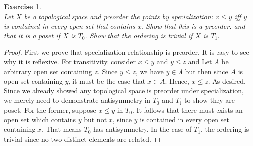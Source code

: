 \documentclass[a4paper, 11pt]{book}
\theoremstyle{plain}
\newtheorem{exercise}{Exercise}[chapter]
\theoremstyle{plain}
\begin{document}
  \begin{exercise} $ $ \\
    Let $X$ be a topological space and preorder the points by specialization: $x \leq y$ iff $y$ is contained in every open set that contains $x$. Show that this is a preorder, and that it is a poset if $X$ is $T_0$. Show that the ordering is trivial if $X$ is $T_1$.
  \end{exercise}
  \begin{proof}
    First we prove that specialization relationship is preorder. It is easy to see why it is reflexive. For transitivity, consider $x \leq y$ and $y \leq z$ and Let $A$ be arbitrary open set containing $z$. Since $y \leq z$, we have $y \in A$ but then since $A$ is open set containing $y$, it must be the case that $x \in A$. Hence, $x \leq z$. As desired. \\

    Since we already showed any topological space is preorder under specialization, we merely need to demonstrate antisymmetry in $T_0$ and $T_1$ to show they are poset. For the former, suppose $x \leq y$ in $T_0$. It follows that there must exists an open set which contains $y$ but not $x$, since $y$ is contained in every open set containing $x$. That means $T_0$ has antisymmetry. In the case of $T_1$, the ordering is trivial since no two distinct elements are related.
  \end{proof}
\end{document}

